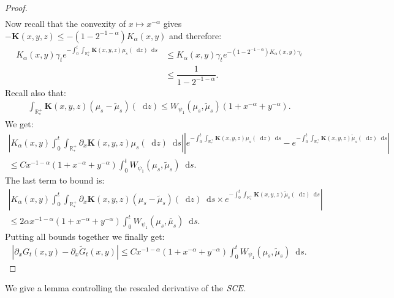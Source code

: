 \documentclass[11pt,a4paper]{article}
\newcommand{\RRP}{\mathbb{R}^+_*}
\newcommand{\SCE}{\emph{SCE}}
\newcommand{\dd}{\mathop{}\!\mathrm{d}}
\begin{document}
\begin{proof}
\begin{multline*}
    \end{multline*}
    Now recall that the convexity of $x \mapsto x^{-\alpha}$ gives $-\mathbf{K}(x,y,z) \leq - (1-2^{-1-\alpha}) K_\alpha(x,y)$ and therefore:
    \begin{align*}
        K_\alpha(x,y) \gamma_t e^{-\int_0^t \int_{\RRP}\mathbf{K}(x,y,z)\mu_s(\dd z) \dd s} 
        &\leq K_\alpha(x,y) \gamma_t e^{-(1-2^{-1-\alpha}) K_\alpha(x,y)\gamma_t} \\
        &\leq \dfrac{1}{1-2^{-1-\alpha}}.
    \end{align*}
    Recall also that:
    \begin{align*}
        \int_{\RRP}\mathbf{K}(x,y,z)(\mu_s-\tilde{\mu}_s)(\dd z) \leq W_{\psi_1}(\mu_s,\tilde{\mu}_s) (1 + x^{-\alpha} + y^{-\alpha}).
    \end{align*}
    We get:
    \begin{multline*}
        \left| K_\alpha(x,y) \int_0^t \int_{\RRP} \partial_x \mathbf{K}(x,y,z)\mu_s(\dd z) \dd s \right|
        \left|e^{-\int_0^t \int_{\RRP}\mathbf{K}(x,y,z)\mu_s(\dd z) \dd s} - e^{-\int_0^t \int_{\RRP}\mathbf{K}(x,y,z)\tilde{\mu}_s(\dd z) \dd s}\right| \\
        \leq C x^{-1-\alpha} (1 + x^{-\alpha} + y^{-\alpha}) \int_0^t  W_{\psi_1}(\mu_s,\tilde{\mu}_s) \dd s.
    \end{multline*}
    The last term to bound is:
    \begin{multline*}
        \left| K_\alpha(x,y) \int_0^t \int_{\RRP} \partial_x \mathbf{K}(x,y,z)\left(\mu_s - \tilde{\mu}_s \right)(\dd z) \dd s \times e^{-\int_0^t \int_{\RRP}\mathbf{K}(x,y,z)\tilde{\mu}_s(\dd z) \dd s} \right| \\
        \leq 2\alpha x^{-1-\alpha}\left( 1 + x^{-\alpha} + y^{-\alpha}\right) \int_0^t W_{\psi_1}(\mu_s,\tilde{\mu_s}) \dd s.
    \end{multline*}
    Putting all bounds together we finally get:
    \begin{align*}
        \left| \partial_x G_t(x,y)- \partial_x \tilde{G}_t(x,y)\right| \leq C x^{-1-\alpha} (1 + x^{-\alpha} + y^{-\alpha}) \int_0^t  W_{\psi_1}(\mu_s,\tilde{\mu}_s) \dd s.
    \end{align*}
\end{proof}
We give a lemma controlling the rescaled derivative of the $\SCE$.
\end{document}
